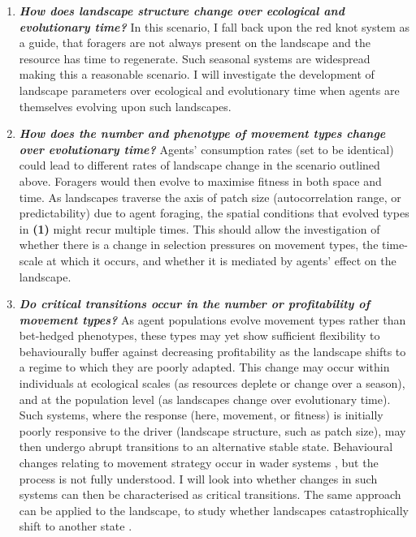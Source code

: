 \begin{enumerate}
  \begin{enumerate}
  \def\labelenumii{\alph{enumii}.}
  \item
    \textbf{\emph{How does landscape structure change over ecological
    and evolutionary time?}} In this scenario, I fall back upon the red
    knot system as a guide, that foragers are not always present on the
    landscape and the resource has time to regenerate. Such seasonal
    systems are widespread making this a reasonable scenario. I will
    investigate the development of landscape parameters over ecological
    and evolutionary time \citep[such as the autocorrelation range, or
    patch size; see][]{legendre1993} when agents are themselves evolving
    upon such landscapes.
  \item
    \textbf{\emph{How does the number and phenotype of movement types
    change over evolutionary time?}} Agents' consumption rates (set to
    be identical) could lead to different rates of landscape change in
    the scenario outlined above. Foragers would then evolve to maximise
    fitness in both space and time. As landscapes traverse the axis of
    patch size (autocorrelation range, or predictability) due to agent
    foraging, the spatial conditions that evolved types in \textbf{(1)}
    might recur multiple times. This should allow the investigation of
    whether there is a change in selection pressures on movement types,
    the time-scale at which it occurs, and whether it is mediated by
    agents' effect on the landscape.
  \item
    \textbf{\emph{Do critical transitions occur in the number or
    profitability of movement types?}} As agent populations evolve
    movement types rather than bet-hedged phenotypes, these types may
    yet show sufficient flexibility to behaviourally buffer against
    decreasing profitability as the landscape shifts to a regime to
    which they are poorly adapted. This change may occur within
    individuals at ecological scales (as resources deplete or change
    over a season), and at the population level (as landscapes change
    over evolutionary time). Such systems, where the response (here,
    movement, or fitness) is initially poorly responsive to the driver
    (landscape structure, such as patch size), may then undergo abrupt
    transitions \citep{scheffer2009} to an alternative stable state.
    Behavioural changes relating to movement strategy occur in wader
    systems \citep{oudman2018}, but the process is not fully understood.
    I will look into whether changes in such systems can then be
    characterised as critical transitions. The same approach can be
    applied to the landscape, to study whether landscapes
    catastrophically shift to another state \citep[as
    in][]{vandekoppel1997, jefferies2006}.
  \end{enumerate}
\end{enumerate}


